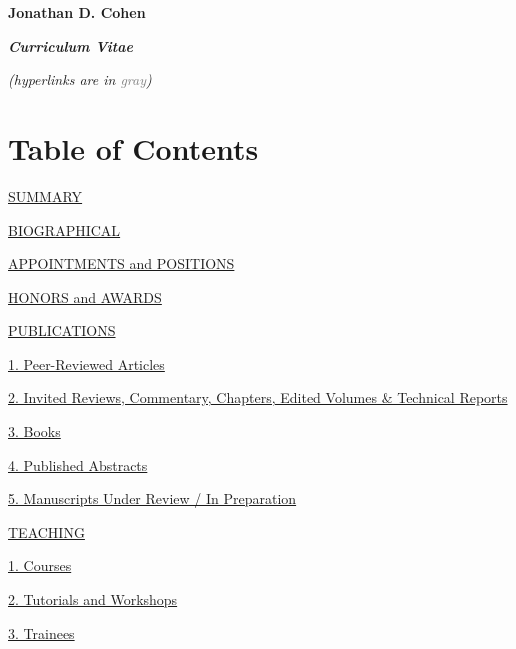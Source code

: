 \documentclass[10 pt]{article}
\begin{document}
\thispagestyle{empty} %

    \begin{center}
{\fontsize{15pt}{16 pt}\selectfont \textbf{Jonathan D. Cohen}}

{\fontsize{14pt}{16 pt}\selectfont \textit{\textbf{Curriculum Vitae}}}

\emph{(hyperlinks are in \textcolor{gray}{gray})}
    \bigskip

\section*{Table of Contents} \label{secTOC}
    \end{center}
    \medskip

\hyperref[secSUMMARY]{SUMMARY}
    \medskip

\hyperref[secBIOGRAPHICAL]{BIOGRAPHICAL}
    \medskip

\hyperref[secAaP]{APPOINTMENTS and POSITIONS}
    \medskip

\hyperref[secHaA]{HONORS and AWARDS}
    \medskip

\hyperref[secPUBLICATIONS]{PUBLICATIONS}

\hyperref[secPUBLICATIONS1]{\hspace{0.4in} 1. Peer-Reviewed Articles }

\hyperref[secPUBLICATIONS2]{\hspace{0.4in} 2. Invited Reviews, Commentary, Chapters, Edited Volumes \& Technical
Reports}

\hyperref[secPUBLICATIONS3]{\hspace{0.4in} 3. Books}

\hyperref[secPUBLICATIONS4]{\hspace{0.4in} 4. Published Abstracts}

\hyperref[secPUBLICATIONS5]{\hspace{0.4in} 5. Manuscripts Under Review / In Preparation}
    \medskip


\hyperref[secTEACHING]{TEACHING}

\hyperref[secTEACHING1]{\hspace{0.4in} 1. Courses}

\hyperref[secTEACHING2]{\hspace{0.4in} 2. Tutorials and Workshops}

\hyperref[secTEACHING3]{\hspace{0.4in} 3. Trainees}
    \medskip
\end{document}
